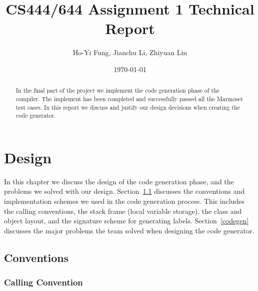 \documentclass[a4paper, notitlepage]{report}
\title{CS444/644 Assignment 1 Technical Report}
\author{Ho-Yi Fung, Jianchu Li, Zhiyuan Lin}
\date{\today}
\begin{document}
{\let\newpage\relax\maketitle}

\vspace{30pt}

\begin{abstract}
In the final part of the project we implement the code generation phase of the compiler. The implement has been completed and successfully passed all the Marmoset test cases. In this report we discuss and justify our design decisions when creating the code generator.
\end{abstract}


\chapter{Design}
\label{design}

In this chapter we discuss the design of the code generation phase, and the problems we solved with our design. Section~\ref{conventions} discusses the conventions and implementation schemes we used in the code generation process. This includes the calling conventions, the stack frame (local variable storage), the class and object layout, and the signature scheme for generating labels. Section~\ref{codegen} discusses the major problems the team solved when designing the code generator.

\section{Conventions}
\label{conventions}
\subsection{Calling Convention}
\label{calling}
\end{document}
